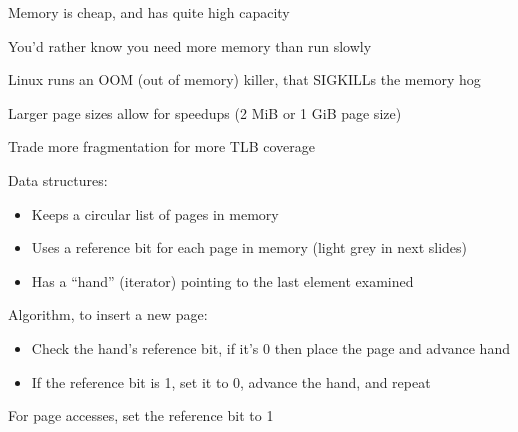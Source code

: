 \begin{slide}


    Memory is cheap, and has quite high capacity

    \leftspace{}You'd rather know you need more memory than run slowly

    \leftspace{}\leftspace{}Linux runs an OOM (out of memory) killer, that
    SIGKILLs the memory hog
    \medskip

    Larger page sizes allow for speedups (2 MiB or 1 GiB page size)

    \leftspace{}Trade more fragmentation for more TLB coverage

\end{slide}

\begin{slide}


    Data structures:
    \begin{itemize}
      \item Keeps a circular list of pages in memory
      \item Uses a reference bit for each page in memory (light grey in next slides)
      \item Has a ``hand'' (iterator) pointing to the last element examined
    \end{itemize}
    \medskip

    Algorithm, to insert a new page:
    \begin{itemize}
      \item Check the hand's reference bit, if it's 0 then place the page and advance hand
      \item If the reference bit is 1, set it to 0, advance the hand, and repeat
    \end{itemize}
    \medskip

    For page accesses, set the reference bit to 1

\end{slide}
  

